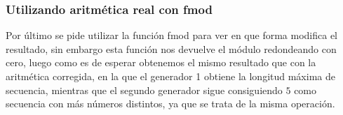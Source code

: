 \documentclass[12pt, spanish]{article}
\begin{document}
\subsubsection{Utilizando aritmética real con fmod}

Por último se pide utilizar la función fmod para ver en que forma modifica el resultado, sin embargo esta función nos devuelve el módulo redondeando con cero, luego como es de esperar obtenemos el mismo resultado que con la aritmética corregida, en la que el generador 1 obtiene la longitud máxima de secuencia, mientras que el segundo generador sigue consiguiendo $5$ como secuencia con más números distintos, ya que se trata de la misma operación.

%
%
\end{document}
